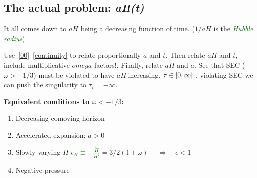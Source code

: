 \subsection{The actual problem: \textit{aH(t)}}
It all comes down to $aH$ being a decreasing function of time. ($1/aH$ is the \textcolor{darkgreen}{\textit{Hubble radius}})

Use~\eqref{00}~\eqref{continuity} to relate proportionally $a$ and $t$. Then relate $aH$ and $t$, include multiplicative $omega$ factors!. Finally, relate  $aH$ and $a$. 
See that SEC ($\omega>-1/3$) must be violated to have $aH$ increasing. \textcolor{darkred}{$\tau \in \interval[open right]{0}{\infty}$} , violating SEC we can push the singularity to $\tau_i = -\infty$.

\begin{mycolorbox}
    \textbf{Equivalent conditions to $\omega<-1/3$:}

    \begin{enumerate}
        \item Decreasing comoving horizon
        \item Accelerated expansion: $\ddot{a} >0$
        \item Slowly varying $H$ \hfill \textcolor{darkgreen}{$\epsilon_H \equiv -\frac{\dot{H}}{H^2}$}\textcolor{mypurple}{$=3/2 (1+\omega)$} $\quad\Rightarrow \quad\epsilon < 1$
        \item Negative pressure
    \end{enumerate}
\end{mycolorbox}    

